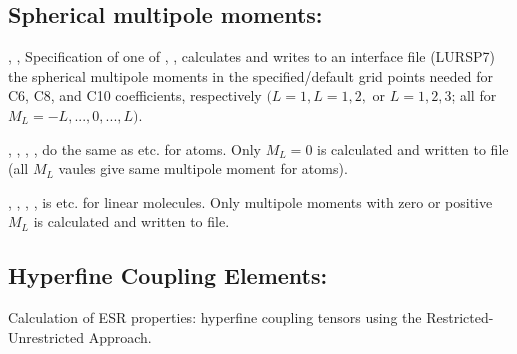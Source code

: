 \subsection{Spherical multipole moments: }

\begin{description}

\item{, , }
Specification of one of , , 
calculates and writes to an interface file (LURSP7) the spherical multipole
moments in the specified/default grid points needed for C6, C8, and C10
coefficients, respectively $(L=1, L=1,2,$ or $L=1,2,3$; all for $M_L =
-L,...,0,...,L)$.

\item{, , }
, ,  do the same as  etc. for
atoms. Only $M_L=0$ is
calculated and written to file (all $M_L$ vaules give same multipole moment 
for 
atoms).

\item{, , }
, ,  is  etc. for linear
molecules. Only
multipole moments with zero or positive $M_L$
is calculated and written to 
file.

\end{description}

\subsection{Hyperfine Coupling Elements: }

Calculation of ESR properties: hyperfine coupling tensors using 
the Restricted-Unrestricted Approach.

